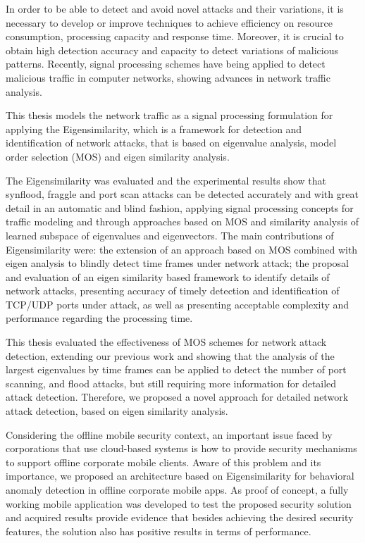 In order to be able to detect and avoid novel attacks and their variations, it is necessary to develop or improve techniques to achieve efficiency on resource consumption, processing capacity and response time. Moreover, it is crucial to obtain high detection accuracy and capacity to detect variations of malicious patterns. Recently, signal processing schemes have being applied to detect malicious traffic in computer networks, showing advances in network traffic analysis.

This thesis models the network traffic as a signal processing formulation for applying the Eigensimilarity, which is a framework for detection and identification of network attacks, that is based on eigenvalue analysis, model order selection (MOS) and eigen similarity analysis.

The Eigensimilarity was evaluated and the experimental results show that synflood, fraggle and port scan attacks can be detected accurately and with great detail in an automatic and blind fashion, applying signal processing concepts for traffic modeling and through approaches based on MOS and similarity analysis of learned subspace of eigenvalues and eigenvectors. The main contributions of Eigensimilarity were: the extension of an approach based on MOS combined with eigen analysis to blindly detect time frames under network attack; the proposal and evaluation of an eigen similarity based framework to identify details of network attacks, presenting accuracy of timely detection and identification of TCP/UDP ports under attack, as well as presenting acceptable complexity and performance regarding the processing time.

This thesis evaluated the effectiveness of MOS schemes for network attack detection, extending our previous work and showing that the analysis of the largest eigenvalues by time frames can be applied to detect the number of port scanning, and flood attacks, but still requiring more information for detailed attack detection. Therefore, we proposed a novel approach for detailed network attack detection, based on eigen similarity analysis.

Considering the offline mobile security context, an important issue faced by corporations that use cloud-based systems is how to provide security mechanisms to support offline corporate mobile clients. Aware of this problem and its importance, we proposed an architecture based on Eigensimilarity for behavioral anomaly detection in offline corporate mobile apps. As proof of concept, a fully working mobile application was developed to test the proposed security solution and acquired results provide evidence that besides achieving the desired security features, the solution also has positive results in terms of performance. 

